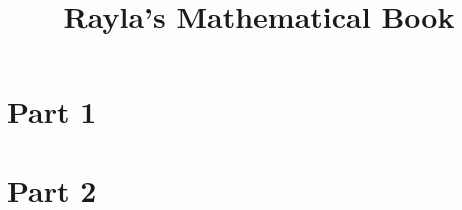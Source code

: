\documentclass{rayla_textbook}
\title{Rayla's Mathematical Book}
\begin{document}
    \raylabook
    \mainmatter

    \part{Part 1}{\lipsum[1]}
    
    
    
    
    

    \part{Part 2}{\lipsum[1]}
    
    
    
%    
%    

%    
%    
%    
%    
%    

    ~\nocite{*}

    \raylaEndBook
\end{document}
